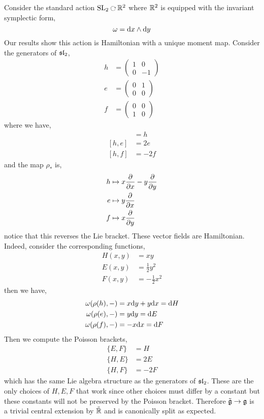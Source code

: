\documentclass[12pt]{extarticle}
\begin{document}
\begin{example}
Consider the standard action $\SL_2 \acts \RR^2$ where $\RR^2$ is equipped with the invariant symplectic form,
\[ \omega = \d{x} \wedge \d{y} \]
Our results show this action is Hamiltonian with a unique moment map. Consider the generators of $\sl_2$,
\begin{align*} 
h &= 
\begin{pmatrix}
1 & 0
\\
0 & -1
\end{pmatrix}
\\
e & = \begin{pmatrix}
0 & 1
\\
0 & 0
\end{pmatrix}
\\
f & =
\begin{pmatrix}
0 & 0 
\\
1 & 0
\end{pmatrix} 
\end{align*}
where we have,
\begin{align*}
[e,f] & = h
\\
[h, e] &= 2e
\\
[h, f] &= -2f
\end{align*}
and the map $\rho_*$ is,
\begin{align*}
h & \mapsto x \pderiv{}{x} - y \pderiv{}{y}
\\
e & \mapsto y \pderiv{}{x}
\\
f & \mapsto x \pderiv{}{y}
\end{align*}
notice that this reverses the Lie bracket. These vector fields are Hamiltonian. Indeed, consider the corresponding functions,
\begin{align*}
H(x,y) & = xy
\\
E(x,y) & = \tfrac{1}{2} y^2
\\
F(x,y) & = - \tfrac{1}{2} x^2
\end{align*}
then we have,
\begin{align*}
\omega(\rho(h), -) & = x \d{y} + y \d{x} = \d{H}
\\
\omega(\rho(e), -) & = y \d{y} = \d{E}
\\
\omega(\rho(f), -) & = - x \d{x} = \d{F}
\end{align*}
Then we compute the Poisson brackets,
\begin{align*}
\{ E, F \} & = H
\\
\{ H, E \} & = 2 E
\\
\{ H, F \} & = -2 F
\end{align*}
which has the same Lie algebra structure as the generators of $\sl_2$. These are the only choices of $H,E,F$ that work since other choices must differ by a constant but these constants will not be preserved by the Poisson bracket. Therefore $\tilde{\g} \to \g$ is a trivial central extension by $\tilde{\RR}$ and is canonically split as expected. 
\end{example}
\end{document}
